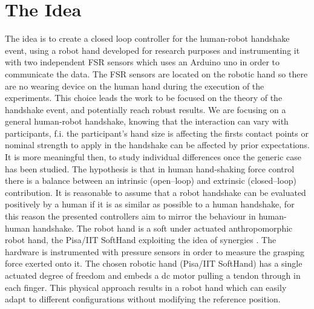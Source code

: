 \chapter{The Idea}
The idea is to create a closed loop controller for the human-robot handshake event, using a robot hand developed for research purposes and instrumenting it with two independent FSR sensors which uses an Arduino uno in order to communicate the data.
The FSR sensors are located on the robotic hand so there are no wearing device on the human hand during the execution of the experiments.
This choice leads the work to be focused on the theory of the handshake event, and potentially reach robust results. We are focusing on a general human-robot handshake, knowing that the interaction can vary with participants, f.i. the participant's hand size is affecting the firsts contact points or nominal strength to apply in the handshake can be affected by prior expectations. It is more meaningful then, to study individual differences once the generic case has been studied.
The hypothesis is that in human hand-shaking force control there is a balance between an intrinsic (open–loop) and extrinsic (closed–loop) contribution.
It is reasonable to assume that a robot handshake can be evaluated positively by a human if it is as similar as possible to a human handshake, for this reason the presented controllers aim to mirror the behaviour in human-human handshake.
The robot hand is a soft under actuated anthropomorphic robot hand, the Pisa/IIT SoftHand exploiting the idea of synergies \cite{catalano2014adaptive}. The hardware is instrumented with pressure sensors in order to measure the grasping force exerted onto it.%
The chosen robotic hand (Pisa/IIT SoftHand) has a single actuated degree of freedom and embeds a dc motor pulling a tendon through in each finger. This physical approach results in a robot hand which can easily adapt to different configurations without modifying the reference position. 

